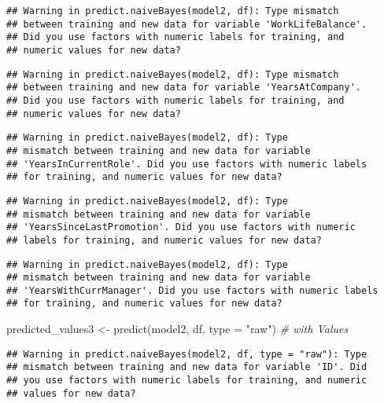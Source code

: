 \documentclass[
]{article}
\newenvironment{Shaded}{\begin{snugshade}}{\end{snugshade}}
\newcommand{\AttributeTok}[1]{\textcolor[rgb]{0.77,0.63,0.00}{#1}}
\newcommand{\CommentTok}[1]{\textcolor[rgb]{0.56,0.35,0.01}{\textit{#1}}}
\newcommand{\FunctionTok}[1]{\textcolor[rgb]{0.00,0.00,0.00}{#1}}
\newcommand{\NormalTok}[1]{#1}
\newcommand{\OtherTok}[1]{\textcolor[rgb]{0.56,0.35,0.01}{#1}}
\newcommand{\StringTok}[1]{\textcolor[rgb]{0.31,0.60,0.02}{#1}}
\begin{document}
\begin{verbatim}
## Warning in predict.naiveBayes(model2, df): Type mismatch
## between training and new data for variable 'WorkLifeBalance'.
## Did you use factors with numeric labels for training, and
## numeric values for new data?
\end{verbatim}

\begin{verbatim}
## Warning in predict.naiveBayes(model2, df): Type mismatch
## between training and new data for variable 'YearsAtCompany'.
## Did you use factors with numeric labels for training, and
## numeric values for new data?
\end{verbatim}

\begin{verbatim}
## Warning in predict.naiveBayes(model2, df): Type
## mismatch between training and new data for variable
## 'YearsInCurrentRole'. Did you use factors with numeric labels
## for training, and numeric values for new data?
\end{verbatim}

\begin{verbatim}
## Warning in predict.naiveBayes(model2, df): Type
## mismatch between training and new data for variable
## 'YearsSinceLastPromotion'. Did you use factors with numeric
## labels for training, and numeric values for new data?
\end{verbatim}

\begin{verbatim}
## Warning in predict.naiveBayes(model2, df): Type
## mismatch between training and new data for variable
## 'YearsWithCurrManager'. Did you use factors with numeric labels
## for training, and numeric values for new data?
\end{verbatim}

\begin{Shaded}
\begin{Highlighting}[]
\NormalTok{predicted\_values3 }\OtherTok{\textless{}{-}} \FunctionTok{predict}\NormalTok{(model2, df, }\AttributeTok{type =} \StringTok{"raw"}\NormalTok{) }\CommentTok{\# with Values}
\end{Highlighting}
\end{Shaded}

\begin{verbatim}
## Warning in predict.naiveBayes(model2, df, type = "raw"): Type
## mismatch between training and new data for variable 'ID'. Did
## you use factors with numeric labels for training, and numeric
## values for new data?
\end{verbatim}
\end{document}
